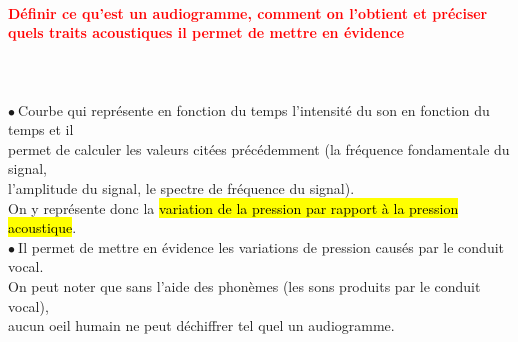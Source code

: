 \documentclass[letterpaper, 12pt]{article}
\newcommand{\alinea}{
\hspace*{0.3cm}}
\newcommand{\red}[1]{
	\textcolor{red}{#1}
}
\newcommand{\point}{$\bullet\ $}
\begin{document}
		\paragraph{\red{Définir ce qu'est un audiogramme, comment on l'obtient et préciser quels traits 
		acoustiques \hspace*{0.035cm} il permet de mettre en évidence}}~\\ ~\\
			\point Courbe qui représente en fonction du temps l'intensité du son en fonction du temps et il
			\\\alinea permet de calculer les valeurs citées précédemment (la fréquence fondamentale du signal,
		    \\\alinea l'amplitude du signal, le spectre de fréquence du signal). 
			\\\alinea On y représente donc la \hl{variation de la pression par rapport \`a la pression acoustique}.
			\\
			\point Il permet de mettre en évidence les variations de pression causés par le conduit vocal.	
			\\\alinea On peut noter que sans l'aide des phonèmes (les sons produits par le conduit vocal),  
			\\\alinea aucun oeil humain ne peut déchiffrer tel quel un audiogramme.
			
		
\end{document}
